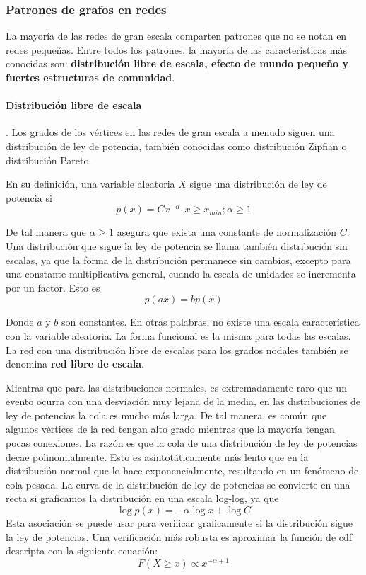 \subsubsection{Patrones de grafos en redes}
La mayoría de las redes de gran escala comparten patrones que no se notan en redes pequeñas. Entre todos los patrones, la mayoría de las características más conocidas son: \textbf{distribución libre de escala, efecto de mundo pequeño y fuertes estructuras de comunidad}.\cite{Tang2010}

\paragraph{Distribución libre de escala} \cite{Tang2010}.
\label{par:definicion-libre-escala}
Los grados de los vértices en las redes de gran escala a menudo siguen una distribución de ley de potencia, también conocidas como distribución Zipfian o distribución Pareto. 

En su definición, una variable aleatoria $X$ sigue una distribución de ley de potencia si
\begin{equation}
p(x)=Cx^{-\alpha}, x\geq  x_{min}; \alpha \geq 1
\end{equation}

De tal manera que $\alpha \geq 1$ asegura que exista una constante de normalización $C$. Una distribución que sigue la ley de potencia se llama también  distribución sin escalas, ya que la forma de la distribución permanece sin cambios, excepto para una constante multiplicativa general, cuando la escala de unidades se incrementa por un factor. Esto es
\begin{equation}
p(ax)=bp(x)
\end{equation}
 
Donde $a$ y $b$ son constantes. En otras palabras, no existe una escala característica con la variable aleatoria. La forma funcional es la misma para todas las escalas. La red con una distribución libre de escalas para los grados nodales también se denomina \textbf{red libre de escala}.
 
Mientras que para las distribuciones normales, es extremadamente raro que un evento ocurra con una desviación muy lejana de la media, en las distribuciones de ley de potencias la cola es mucho más larga. De tal manera, es común que algunos vértices de la red tengan alto grado mientras que la mayoría tengan pocas conexiones. La razón es que la cola de una distribución de ley de potencias decae polinomialmente. Esto es asintotáticamente más lento que en la distribución normal que lo hace exponencialmente, resultando en un fenómeno de cola pesada. La curva de la distribución de ley de potencias se convierte en una recta si graficamos la distribución en una escala log-log, ya que
\begin{equation}
\log p(x) =-\alpha \log x + \log C
\end{equation}
Esta asociación se puede usar para verificar graficamente si la distribución sigue la ley de potencias. Una verificación más robusta es aproximar la función de \acrfull{cdf} descripta con la siguiente ecuación:
\begin{equation}
F(X\geq x) \propto  x^{-\alpha+1 }
\end{equation}

